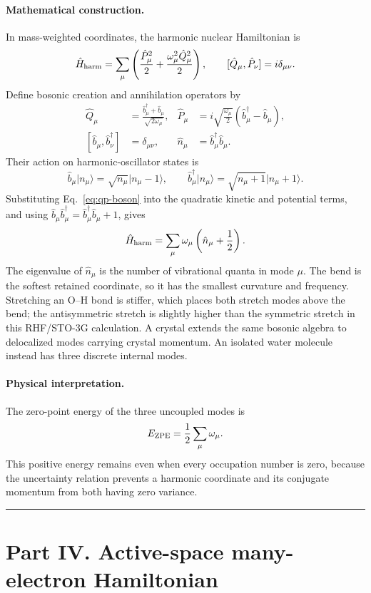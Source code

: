 \documentclass[10pt,twocolumn]{article}
\newcommand{\ket}[1]{\lvert #1\rangle}
\newcommand{\conceptbreak}{%
  \par\medskip\noindent
  {\color{black!30}\rule{\columnwidth}{0.35pt}}%
  \par\medskip}
\newcommand{\mathderiv}{\paragraph{Mathematical construction.}}
\newcommand{\physical}{\paragraph{Physical interpretation.}}
\begin{document}
\mathderiv In mass-weighted coordinates, the harmonic nuclear Hamiltonian is
\begin{equation}
\hat H_{\rm harm}=\sum_\mu\left(
\frac{\hat P_\mu^2}{2}+\frac{\omega_\mu^2\hat Q_\mu^2}{2}\right),
\qquad [\hat Q_\mu,\hat P_\nu]=i\delta_{\mu\nu}.
\label{eq:harmonic-hamiltonian}
\end{equation}
Define bosonic creation and annihilation operators by
\begin{align}
\hat Q_\mu&=\frac{\hat b_\mu^\dagger+\hat b_\mu}
{\sqrt{2\omega_\mu}},
&
\hat P_\mu&=i\sqrt{\frac{\omega_\mu}{2}}
(\hat b_\mu^\dagger-\hat b_\mu),
\label{eq:qp-boson}\\
[\hat b_\mu,\hat b_\nu^\dagger]&=\delta_{\mu\nu},
&
\hat n_\mu&=\hat b_\mu^\dagger\hat b_\mu.
\end{align}
Their action on harmonic-oscillator states is
\begin{equation}
\hat b_\mu\ket{n_\mu}=\sqrt{n_\mu}\ket{n_\mu-1},
\qquad
\hat b_\mu^\dagger\ket{n_\mu}
=\sqrt{n_\mu+1}\ket{n_\mu+1}.
\label{eq:ladder-action}
\end{equation}
Substituting Eq.~\eqref{eq:qp-boson} into the quadratic kinetic and potential
terms, and using
$\hat b_\mu\hat b_\mu^\dagger=\hat b_\mu^\dagger\hat b_\mu+1$, gives
\begin{equation}
\hat H_{\rm harm}=\sum_\mu\omega_\mu
\left(\hat n_\mu+\frac12\right).
\label{eq:harmonic-number}
\end{equation}
The eigenvalue of $\hat n_\mu$ is the number of vibrational quanta in mode
$\mu$.  The bend is the softest retained coordinate, so it has the smallest
curvature and frequency.  Stretching an O--H bond is stiffer, which places both
stretch modes above the bend; the antisymmetric stretch is slightly higher
than the symmetric stretch in this RHF/STO-3G calculation.  A crystal extends
the same bosonic algebra to delocalized modes carrying crystal momentum.  An
isolated water molecule instead has three discrete internal modes.

\physical The zero-point energy of the three uncoupled modes is
\begin{equation}
E_{\rm ZPE}=\frac12\sum_\mu\omega_\mu.
\label{eq:zpe}
\end{equation}
This positive energy remains even when every occupation number is zero,
because the uncertainty relation prevents a harmonic coordinate and its
conjugate momentum from both having zero variance.

\conceptbreak

\section*{Part IV. Active-space many-electron Hamiltonian}
\end{document}
